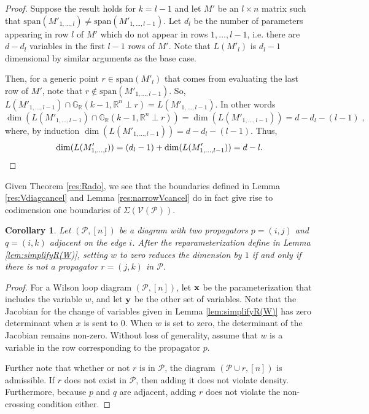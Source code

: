 \documentclass[11pt]{article}
\newcommand{\R}{\mathbb{R}}
\newcommand{\Grall}{\mathbb{G}_{\R}}
\newcommand{\cP}{\mathcal{P}}
\newcommand{\cV}{\mathcal{V}}
\newcommand{\VP}{\cV(\cP)}
\newtheorem{cor}[thm]{Corollary}
\theoremstyle{remark}
\theoremstyle{definition}
\begin{document}
\begin{appendices}
\begin{proof}
Suppose the result holds for $k = l-1$ and let $M'$ be an $l \times n$ matrix such that $\mathrm{span}(M'_{1,\dots,l}) \neq \mathrm{span}(M'_{1,\dots,l-1})$. Let $d_l$ be the number of parameters appearing in row $l$ of $M'$ which do not appear in rows $1, \dots, l-1$, i.e. there are $d - d_l$ variables in the first $l-1$ rows of $M'$. Note that $L(M'_l)$ is $d_l -1$ dimensional by similar arguments as the base case.

Then, for a generic point $r \in \mathrm{span}(M'_{l})$ that comes from evaluating the last row of $M'$, note that $r \notin \mathrm{span}(M'_{1,\dots,l-1})$. So, $L(M'_{1,\dots,l-1})\cap \Grall(k-1, \mathbb{R}^n \perp r) = L(M'_{1,\dots,l-1})$. In other words
%
\begin{displaymath}
\dim(L(M'_{1,\dots,l-1}) \cap \Grall(k-1, \mathbb{R}^n \perp r)) = \dim(L(M'_{1,\dots,l-1})) = d - d_l -(l-1)\;,
\end{displaymath}
%
\noindent
where, by induction $\dim(L(M'_{1,\dots,l-1})) = d - d_l -(l-1)$. Thus,
%
\begin{displaymath}
\dim(L(M'_{1,\dots,l})) = (d_l - 1) + \dim(L(M'_{1,\dots,l-1})) = d-l.
\qedhere
\end{displaymath}
\end{proof}

Given Theorem \ref{res:Rado}, we see that the boundaries defined in Lemma \ref{res:Vdiagcancel} and Lemma \ref{res:narrowVcancel} do in fact give rise to codimension one boundaries of $\Sigma(\VP)$.

\begin{cor} \label{res:reparamdim}
Let $(\cP, [n])$ be a diagram with two propagators $p = (i, j)$ and $q = (i, k)$ adjacent on the edge $i$. After the reparameterization define in Lemma \ref{lem:simplifyR(W)}, setting $w$ to zero reduces the dimension by $1$ if and only if there is not a propagator $r = (j, k)$ in $\cP$.
\end{cor}
\begin{proof}
For a Wilson loop diagram $(\cP, [n])$, let $\bf{x}$ be the parameterization that includes the variable $w$, and let $\bf{y}$ be the other set of variables. Note that the Jacobian for the change of variables given in Lemma \ref{lem:simplifyR(W)} has zero determinant when $x$ is sent to $0$. When $w$ is set to zero, the determinant of the Jacobian remains non-zero. Without loss of generality, assume that $w$ is a variable in the row corresponding to the propagator $p$.

Further note that whether or not $r$ is in $\cP$, the diagram $(\cP \cup r, [n])$ is admissible. If $r$ does not exist in $\cP$, then adding it does not violate density. Furthermore, because $p$ and $q$ are adjacent, adding $r$ does not violate the non-crossing condition either. 


\end{proof}
\end{appendices}
\end{document}
